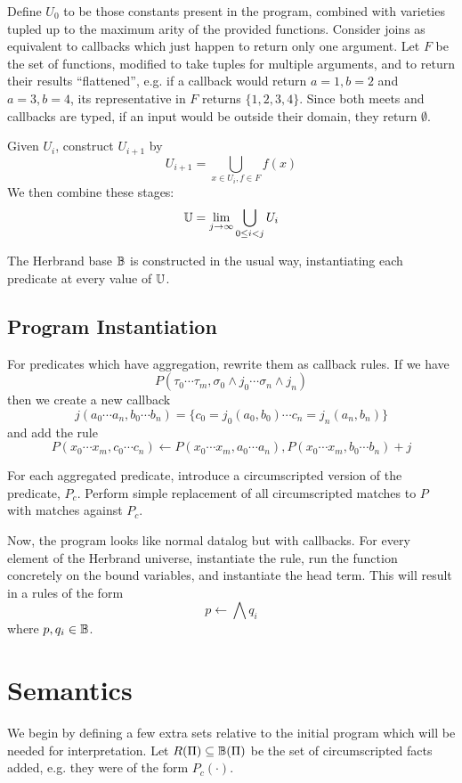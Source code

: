 Define $U_0$ to be those constants present in the program, combined with varieties tupled up to the maximum arity of the provided functions.
Consider joins as equivalent to callbacks which just happen to return only one argument.
Let $F$ be the set of functions, modified to take tuples for multiple arguments, and to return their results ``flattened'', e.g. if a callback would return $a = 1, b = 2$ and $a = 3, b = 4$, its representative in $F$ returns $\{1, 2, 3, 4\}$.
Since both meets and callbacks are typed, if an input would be outside their domain, they return $\emptyset$.

Given $U_i$, construct $U_{i + 1}$ by
\[
	U_{i + 1} = \bigcup_{x \in U_i, f \in F} f(x)
\]
We then combine these stages:
\[
	\mathbb{U} = \lim_{j \rightarrow \infty} \bigcup_{0 \leq i < j} U_i
\]

The Herbrand base $\mathbb{B}$ is constructed in the usual way, instantiating each predicate at every value of $\mathbb{U}$.

\subsection{Program Instantiation}
For predicates which have aggregation, rewrite them as callback rules.
If we have
\[
	P(\tau_0 \cdots \tau_m, \sigma_0\wedge j_0 \cdots \sigma_n \wedge j_n)
\]
then we create a new callback
\[
	j(a_0 \cdots a_n, b_0 \cdots b_n) = \{c_0 = j_0(a_0, b_0) \cdots c_n = j_n(a_n, b_n)\}
\]
and add the rule
\[
	P(x_0 \cdots x_m, c_0 \cdots c_n) \leftarrow P(x_0 \cdots x_m, a_0 \cdots a_n), P(x_0 \cdots x_m, b_0 \cdots b_n) + j
\]

For each aggregated predicate, introduce a circumscripted version of the predicate, $P_c$.
Perform simple replacement of all circumscripted matches to $P$ with matches against $P_c$.

Now, the program looks like normal datalog but with callbacks.
For every element of the Herbrand universe, instantiate the rule, run the function concretely on the bound variables, and instantiate the head term.
This will result in a rules of the form
\[
	p \leftarrow \bigwedge q_i
\]
where $p, q_i \in \mathbb{B}$.

\section{Semantics}
\label{formal:sec:semantics}
We begin by defining a few extra sets relative to the initial program which will be needed for interpretation.
Let $R(\Pi) \subseteq \mathbb{B}(\Pi)$ be the set of circumscripted facts added, e.g. they were of the form $P_c(\cdot)$.

